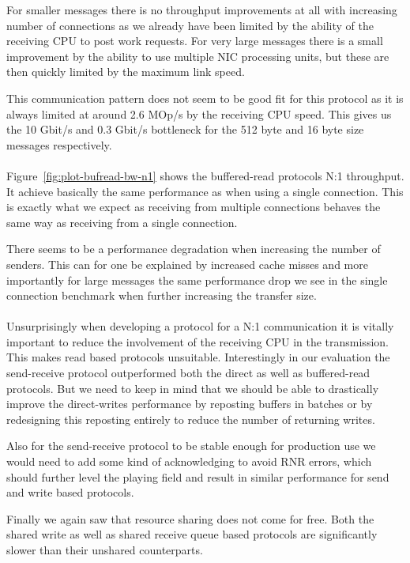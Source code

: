 For smaller messages there is no throughput improvements at all with increasing number of connections as we already have 
been limited by the ability of the receiving CPU to post work requests. For very large messages there is a small improvement 
by the ability to use multiple NIC processing units, but these are then quickly limited by the maximum link speed.

This communication pattern does not seem to be good fit for this protocol as it is always limited at around 
2.6 MOp/s by the receiving CPU speed. This gives us the 10 Gbit/s and 0.3 Gbit/s bottleneck for the 512 byte and 16 byte size
messages respectively.

\paragraph{} Figure~\ref{fig:plot-bufread-bw-n1} shows the buffered-read protocols N:1 throughput. It achieve basically the 
same performance as when using a single connection. This is exactly what we expect as receiving from multiple connections
behaves the same way as receiving from a single connection.

There seems to be a performance degradation when increasing the number of senders. This can for one be explained
by increased cache misses and more importantly for large messages the same performance drop we see in the single connection 
benchmark when further increasing the transfer size.


\paragraph{} Unsurprisingly when developing a protocol for a N:1 communication it is vitally important to reduce the 
involvement of the receiving CPU in the transmission. This makes read based protocols unsuitable. Interestingly in our
evaluation the send-receive protocol outperformed both the direct as well as buffered-read protocols. But we need to 
keep in mind that we should be able to drastically improve the direct-writes performance by reposting buffers in batches or 
by redesigning this reposting entirely to reduce the number of returning writes.

Also for the send-receive protocol to be stable enough for production use we would need to add some kind of acknowledging to
avoid RNR errors, which should further level the playing field and result in similar performance for send and write based 
protocols.

Finally we again saw that resource sharing does not come for free. Both the shared write as well as shared receive queue based
protocols are significantly slower than their unshared counterparts. 








